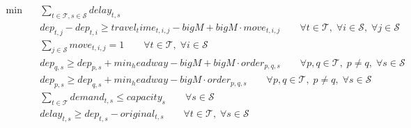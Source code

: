 \begin{align}
  \min\quad & \sum_{t \in \mathcal{T}, s \in \mathcal{S}} delay_{t,s} \tag{total\_delay} \\
  & dep_{t,j} - dep_{t,i} \ge travel_time_{t,i,j} - bigM + bigM \cdot move_{t,i,j} \qquad \forall t \in \mathcal{T},\; \forall i \in \mathcal{S},\; \forall j \in \mathcal{S} \tag{flow\_link} \\
  & \sum_{j \in \mathcal{S}} move_{t,i,j} = 1 \qquad \forall t \in \mathcal{T},\; \forall i \in \mathcal{S} \tag{move\_choice} \\
  & dep_{q,s} \ge dep_{p,s} + min_headway - bigM + bigM \cdot order_{p,q,s} \qquad \forall p,q \in \mathcal{T},\; p\neq q,\; \forall s \in \mathcal{S} \tag{headway\_precede} \\
  & dep_{p,s} \ge dep_{q,s} + min_headway - bigM \cdot order_{p,q,s} \qquad \forall p,q \in \mathcal{T},\; p\neq q,\; \forall s \in \mathcal{S} \tag{headway\_follow} \\
  & \sum_{t \in \mathcal{T}} demand_{t,s} \le capacity_{s} \qquad \forall s \in \mathcal{S} \tag{capacity\_constr} \\
  & delay_{t,s} \ge dep_{t,s} - original_{t,s} \qquad \forall t \in \mathcal{T},\; \forall s \in \mathcal{S} \tag{delay\_def}
\end{align}